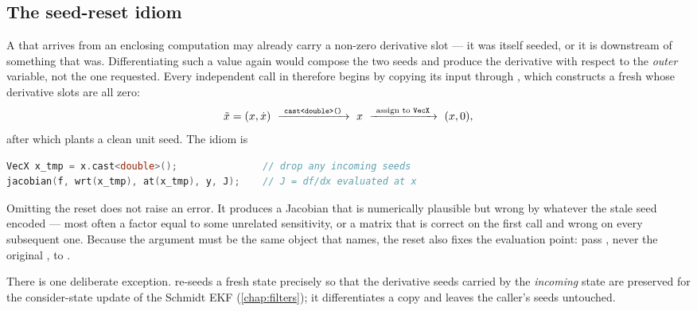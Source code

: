 \subsection{The seed-reset idiom}
\label{sec:ad-seedreset}

A  that arrives from an enclosing computation may already carry a
non-zero derivative slot --- it was itself seeded, or it is downstream of
something that was. Differentiating such a value again would compose the two
seeds and produce the derivative with respect to the \emph{outer} variable,
not the one requested. Every independent  call in \lupnt{}
therefore begins by copying its input through , which
constructs a fresh  whose derivative slots are all zero:
\begin{equation}
  \label{eq:ad-seedreset}
  \tilde{x} = (x, \dot{x})
  \ \xrightarrow{\ \texttt{cast<double>()}\ }\ x
  \ \xrightarrow{\ \text{assign to } \texttt{VecX}\ }\ (x, 0),
\end{equation}
after which  plants a clean unit seed. The idiom is

\begin{lstlisting}[language=cpp, caption={Canonical seed reset. This two-line pattern precedes every independent Jacobian in the code base.}, label={lst:ad-idiom}]
VecX x_tmp = x.cast<double>();               // drop any incoming seeds
jacobian(f, wrt(x_tmp), at(x_tmp), y, J);    // J = df/dx evaluated at x
\end{lstlisting}

\begin{lupntwarning}
  Omitting the reset does not raise an error. It produces a Jacobian that is
  numerically plausible but wrong by whatever the stale seed encoded --- most
  often a factor equal to some unrelated sensitivity, or a matrix that is
  correct on the first call and wrong on every subsequent one. Because the
   argument must be the same object that  names,
  the reset also fixes the evaluation point: pass , never the
  original , to .
\end{lupntwarning}

There is one deliberate exception. 
re-seeds a fresh state precisely so that the derivative seeds carried by the
\emph{incoming} state are preserved for the consider-state update of the
Schmidt EKF (\cref{chap:filters}); it differentiates a copy and leaves the
caller's seeds untouched.


